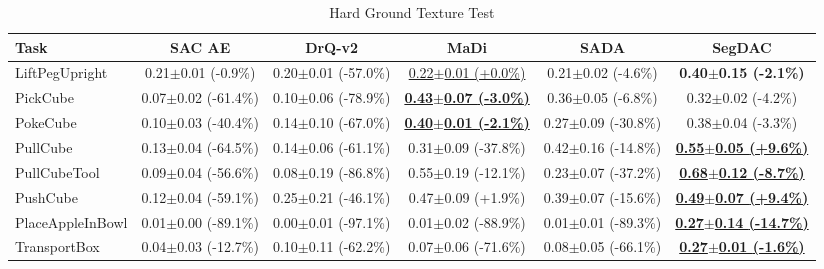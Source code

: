 \begin{table}[htbp]
\centering
\scriptsize
\caption{Hard Ground Texture Test}
\label{tab:appendix_groundtexturetest_hard}
\begin{adjustbox}{max width=\textwidth}
\begin{tabular}{l*{5}{c}}
\toprule
\textbf{Task} & \textbf{SAC AE} & \textbf{DrQ-v2} & \textbf{MaDi} & \textbf{SADA} & \textbf{SegDAC} \\
\midrule
LiftPegUpright & 0.21$\pm$0.01 \scriptsize{(-0.9\%)} & 0.20$\pm$0.01 \scriptsize{(-57.0\%)} & \underline{0.22$\pm$0.01 \scriptsize{(+0.0\%)}} & 0.21$\pm$0.02 \scriptsize{(-4.6\%)} & \textbf{0.40$\pm$0.15 \scriptsize{(-2.1\%)}} \\
PickCube & 0.07$\pm$0.02 \scriptsize{(-61.4\%)} & 0.10$\pm$0.06 \scriptsize{(-78.9\%)} & \textbf{\underline{0.43$\pm$0.07 \scriptsize{(-3.0\%)}}} & 0.36$\pm$0.05 \scriptsize{(-6.8\%)} & 0.32$\pm$0.02 \scriptsize{(-4.2\%)} \\
PokeCube & 0.10$\pm$0.03 \scriptsize{(-40.4\%)} & 0.14$\pm$0.10 \scriptsize{(-67.0\%)} & \textbf{\underline{0.40$\pm$0.01 \scriptsize{(-2.1\%)}}} & 0.27$\pm$0.09 \scriptsize{(-30.8\%)} & 0.38$\pm$0.04 \scriptsize{(-3.3\%)} \\
PullCube & 0.13$\pm$0.04 \scriptsize{(-64.5\%)} & 0.14$\pm$0.06 \scriptsize{(-61.1\%)} & 0.31$\pm$0.09 \scriptsize{(-37.8\%)} & 0.42$\pm$0.16 \scriptsize{(-14.8\%)} & \textbf{\underline{0.55$\pm$0.05 \scriptsize{(+9.6\%)}}} \\
PullCubeTool & 0.09$\pm$0.04 \scriptsize{(-56.6\%)} & 0.08$\pm$0.19 \scriptsize{(-86.8\%)} & 0.55$\pm$0.19 \scriptsize{(-12.1\%)} & 0.23$\pm$0.07 \scriptsize{(-37.2\%)} & \textbf{\underline{0.68$\pm$0.12 \scriptsize{(-8.7\%)}}} \\
PushCube & 0.12$\pm$0.04 \scriptsize{(-59.1\%)} & 0.25$\pm$0.21 \scriptsize{(-46.1\%)} & 0.47$\pm$0.09 \scriptsize{(+1.9\%)} & 0.39$\pm$0.07 \scriptsize{(-15.6\%)} & \textbf{\underline{0.49$\pm$0.07 \scriptsize{(+9.4\%)}}} \\
PlaceAppleInBowl & 0.01$\pm$0.00 \scriptsize{(-89.1\%)} & 0.00$\pm$0.01 \scriptsize{(-97.1\%)} & 0.01$\pm$0.02 \scriptsize{(-88.9\%)} & 0.01$\pm$0.01 \scriptsize{(-89.3\%)} & \textbf{\underline{0.27$\pm$0.14 \scriptsize{(-14.7\%)}}} \\
TransportBox & 0.04$\pm$0.03 \scriptsize{(-12.7\%)} & 0.10$\pm$0.11 \scriptsize{(-62.2\%)} & 0.07$\pm$0.06 \scriptsize{(-71.6\%)} & 0.08$\pm$0.05 \scriptsize{(-66.1\%)} & \textbf{\underline{0.27$\pm$0.01 \scriptsize{(-1.6\%)}}} \\
\bottomrule
\end{tabular}
\end{adjustbox}
\end{table}

